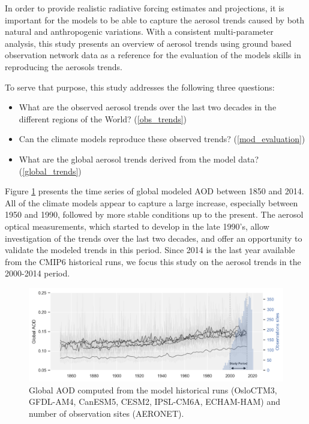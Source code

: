 \documentclass[journal abbreviation, manuscript]{copernicus}
\begin{document}
In order to provide realistic radiative forcing estimates and projections, it is important for the models to be able to capture the aerosol trends caused by both natural and anthropogenic variations. With a consistent multi-parameter analysis, this study presents an overview of aerosol trends using ground based observation network data as a reference for the evaluation of the models skills in reproducing the aerosols trends.

To serve that purpose, this study addresses the following three questions:
\begin{itemize}
    \item What are the observed aerosol trends over the last two decades in the different regions of the World? (\ref{obs_trends})
    \item Can the climate models reproduce these observed trends? (\ref{mod_evaluation})
    \item What are the global aerosol trends derived from the model data? (\ref{global_trends})
\end{itemize}

Figure \ref{fig:hist_runs} presents the time series of global modeled AOD between 1850 and 2014. All of the climate models appear to capture a large increase, especially between 1950 and 1990, followed by more stable conditions up to the present. The aerosol optical measurements, which started to develop in the late 1990's, allow investigation of the trends over the last two decades, and offer an opportunity to validate the modeled trends in this period. Since 2014 is the last year available from the CMIP6 historical runs, we focus this study on the aerosol trends in the 2000-2014 period.

\begin{figure}
 \centering
 \includegraphics[width=12cm]{../scripts/figs/hist_runs.png}
 \caption{Global AOD computed from the model historical runs (OsloCTM3, GFDL-AM4, CanESM5, CESM2, IPSL-CM6A, ECHAM-HAM) and number of observation sites (AERONET).}
 \label{fig:hist_runs}
\end{figure}
\end{document}
